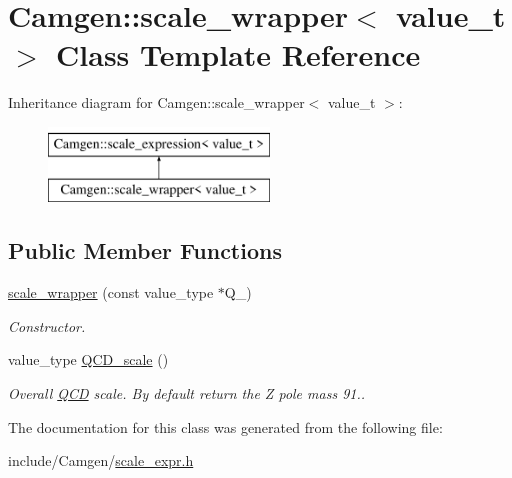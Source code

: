 \hypertarget{a00490}{\section{Camgen\-:\-:scale\-\_\-wrapper$<$ value\-\_\-t $>$ Class Template Reference}
\label{a00490}
}
Inheritance diagram for Camgen\-:\-:scale\-\_\-wrapper$<$ value\-\_\-t $>$\-:\begin{figure}[H]
\begin{center}
\leavevmode
\includegraphics[height=2.000000cm]{a00490}
\end{center}
\end{figure}
\subsection*{Public Member Functions}
\begin{DoxyCompactItemize}
\item 
\hypertarget{a00490_ab05a7aef10a090493e0c21d13cc6b7e1}{\hyperlink{a00490_ab05a7aef10a090493e0c21d13cc6b7e1}{scale\-\_\-wrapper} (const value\-\_\-type $\ast$Q\-\_\-)}\label{a00490_ab05a7aef10a090493e0c21d13cc6b7e1}

\begin{DoxyCompactList}\small\item\em Constructor. \end{DoxyCompactList}\item 
\hypertarget{a00490_a81b1bf92d85b852ea6dfee8e584a7939}{value\-\_\-type \hyperlink{a00490_a81b1bf92d85b852ea6dfee8e584a7939}{Q\-C\-D\-\_\-scale} ()}\label{a00490_a81b1bf92d85b852ea6dfee8e584a7939}

\begin{DoxyCompactList}\small\item\em Overall \hyperlink{a00449}{Q\-C\-D} scale. By default return the Z pole mass 91.. \end{DoxyCompactList}\end{DoxyCompactItemize}


The documentation for this class was generated from the following file\-:\begin{DoxyCompactItemize}
\item 
include/\-Camgen/\hyperlink{a00741}{scale\-\_\-expr.\-h}\end{DoxyCompactItemize}
